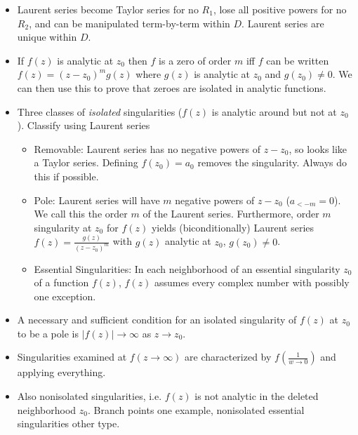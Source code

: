 \documentclass[10pt]{report}
\newcommand{\abs}[1]{\left|#1\right|}
\begin{document}
\begin{itemize}
	\item Laurent series become Taylor series for no $R_1$, lose all positive powers for no $R_2$, and can be manipulated term-by-term within $D$. Laurent series are unique within $D$.
	\item If $f(z)$ is analytic at $z_0$ then $f$ is a zero of order $m$ iff $f$ can be written $f(z) = (z-z_0)^mg(z)$ where $g(z)$ is analytic at $z_0$ and $g(z_0) \neq 0$. We can then use this to prove that zeroes are isolated in analytic functions. 
	\item Three classes of \emph{isolated} singularities ($f(z)$ is analytic around but not at $z_0$). Classify using Laurent series
		\begin{itemize}
			\item Removable: Laurent series has no negative powers of $z-z_0$, so looks like a Taylor series. Defining $f(z_0) = a_0$ removes the singularity. Always do this if possible.
			\item Pole: Laurent series will have $m$ negative powers of $z-z_0$ ($a_{<-m} = 0$). We call this the order $m$ of the Laurent series. Furthermore, order $m$ singularity at $z_0$ for $f(z)$ yields (biconditionally) Laurent series $f(z) = \frac{g(z)}{(z-z_0)^m}$ with $g(z)$ analytic at $z_0$, $g(z_0) \neq 0$. 
			\item Essential Singularities: In each neighborhood of an essential singularity $z_0$ of a function $f(z)$, $f(z)$ assumes every complex number with possibly one exception.
		\end{itemize}
    \item A necessary and sufficient condition for an isolated singularity of $f(z)$ at $z_0$ to be a pole is $\abs{f(z)} \to \infty$ as $z \to z_0$.
    \item Singularities examined at $f(z \to \infty)$ are characterized by $f\left( \frac{1}{w \to 0} \right)$ and applying everything.
    \item Also nonisolated singularities, i.e. $f(z)$ is not analytic in the deleted neighborhood $z_0$. Branch points one example, nonisolated essential singularities other type. 
\end{itemize}
\end{document}
